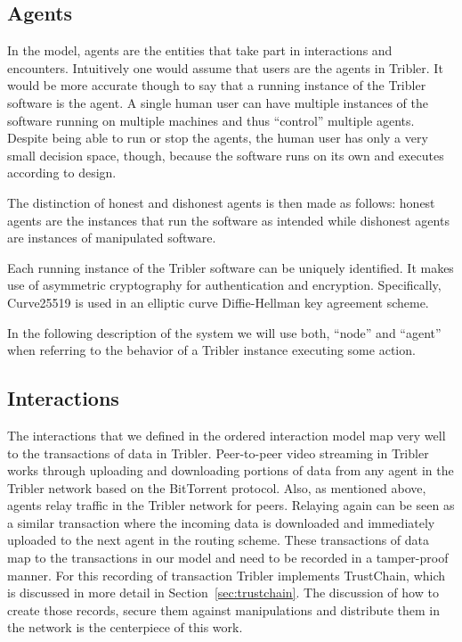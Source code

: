 \subsection{Agents}
In the model, agents are the entities that take part in interactions and encounters. Intuitively one
would assume that users are the agents in Tribler. It would be more accurate though to say that a 
running instance of the Tribler software is the agent. A single human user can have multiple 
instances of the software running on multiple machines and thus ``control'' multiple agents. Despite
being able to run or stop the agents, the human user has only a very small decision space, though, 
because the software runs on its own and executes according to design. 

The distinction of honest and dishonest agents is then made as follows: honest agents are the 
instances that run the software as intended while dishonest agents are instances of manipulated 
software. 

Each running instance of the Tribler software can be uniquely identified. It makes use of asymmetric
cryptography for authentication and encryption. Specifically, Curve25519 is used in an 
elliptic curve Diffie-Hellman key agreement scheme. 

In the following description of the system we will use both, ``node'' and ``agent'' when referring to the 
behavior of a Tribler instance executing some action. 

\subsection{Interactions}
The interactions that we defined in the ordered interaction model map very well to the transactions
of data in Tribler. Peer-to-peer video streaming in Tribler works through uploading and downloading 
portions of data from any agent in the Tribler network based on the BitTorrent protocol. Also, as
mentioned above, agents relay traffic in the Tribler network for peers. Relaying again can be seen 
as a similar transaction where the incoming data is downloaded and immediately uploaded to the next
agent in the routing scheme. These transactions of data map to the transactions in our model and 
need to be recorded in a tamper-proof manner. For this recording of transaction Tribler implements 
TrustChain, which is discussed in 
more detail in Section~\ref{sec:trustchain}. The discussion of how to create those records, secure 
them against manipulations and distribute them in the network is the centerpiece of this work.

